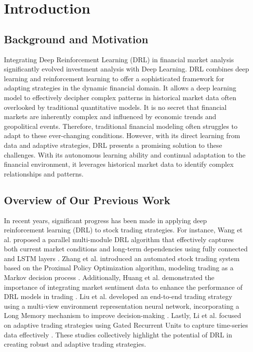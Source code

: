 \section{Introduction}

\subsection{Background and Motivation}
Integrating Deep Reinforcement Learning (DRL) in financial market analysis significantly evolved investment analysis with Deep Learning. DRL combines deep learning and reinforcement learning to offer a sophisticated framework for adapting strategies in the dynamic financial domain. It allows a deep learning model to effectively decipher complex patterns in historical market data often overlooked by traditional quantitative models.
It is no secret that financial markets are inherently complex and influenced by economic trends and geopolitical events. Therefore, traditional financial modeling often struggles to adapt to these ever-changing conditions. However, with its direct learning from data and adaptive strategies, DRL presents a promising solution to these challenges. With its autonomous learning ability and continual adaptation to the financial environment, it leverages historical market data to identify complex relationships and patterns.


\subsection{Overview of Our Previous Work}
In recent years, significant progress has been made in applying deep reinforcement learning (DRL) to stock trading strategies. For instance, Wang et al. proposed a parallel multi-module DRL algorithm that effectively captures both current market conditions and long-term dependencies using fully connected and LSTM layers \cite{parallel_drl_stock_trading}. Zhang et al. introduced an automated stock trading system based on the Proximal Policy Optimization algorithm, modeling trading as a Markov decision process \cite{novel_drl_stock_trading}. Additionally, Huang et al. demonstrated the importance of integrating market sentiment data to enhance the performance of DRL models in trading \cite{market_sentiment_drl_stock_trading}. Liu et al. developed an end-to-end trading strategy using a multi-view environment representation neural network, incorporating a Long Memory mechanism to improve decision-making \cite{drl_end_to_end_stock_trading}. Lastly, Li et al. focused on adaptive trading strategies using Gated Recurrent Units to capture time-series data effectively \cite{adaptive_drl_stock_trading}. These studies collectively highlight the potential of DRL in creating robust and adaptive trading strategies.

